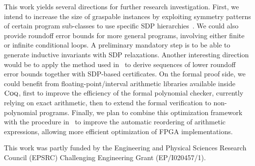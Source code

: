 \documentclass[preprint,fleqn,nocopyrightspace]{sigplanconf}
\newcommand{\coq}{\text{\sc Coq}}
\theoremstyle{plain}
\begin{document}
This work yields several directions for further research investigation. 
First, we intend to increase the size of graspable instances by exploiting symmetry patterns of certain program sub-classes to use specific SDP hierarchies~\cite{Riener2013SymmetricSDP}. We could also provide roundoff error bounds for more general programs, involving either finite or infinite conditional loops. A preliminary mandatory step is to be able to generate inductive invariants with SDP relaxations. Another interesting direction would be to apply the method used in~\cite{Lasserre11} to derive sequences of lower roundoff error bounds together with SDP-based certificates.
On the formal proof side, we could benefit from floating-point/interval arithmetic libraries available inside $\coq$, first to improve the efficiency of the formal polynomial checker, currently relying on exact arithmetic, then to extend the formal verification to non-polynomial programs.
%
Finally, we plan to combine this optimization framework with the procedure in~\cite{Gao15FPGA} to improve the automatic reordering of arithmetic expressions, allowing more efficient optimization of FPGA implementations.

\acks
This work was partly funded by the Engineering and Physical Sciences Research Council (EPSRC) Challenging Engineering Grant (EP/I020457/1).
\newpage



\fi

%
%
\end{document}
